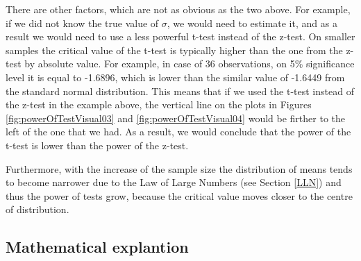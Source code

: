 \documentclass[
]{book}
\theoremstyle{definition}
\theoremstyle{definition}
\theoremstyle{definition}
\theoremstyle{definition}
\theoremstyle{remark}
\begin{document}
There are other factors, which are not as obvious as the two above. For example, if we did not know the true value of \(\sigma\), we would need to estimate it, and as a result we would need to use a less powerful t-test instead of the z-test. On smaller samples the critical value of the t-test is typically higher than the one from the z-test by absolute value. For example, in case of 36 observations, on 5\% significance level it is equal to -1.6896, which is lower than the similar value of -1.6449 from the standard normal distribution. This means that if we used the t-test instead of the z-test in the example above, the vertical line on the plots in Figures \ref{fig:powerOfTestVisual03} and \ref{fig:powerOfTestVisual04} would be firther to the left of the one that we had. As a result, we would conclude that the power of the t-test is lower than the power of the z-test.

Furthermore, with the increase of the sample size the distribution of means tends to become narrower due to the Law of Large Numbers (see Section \ref{LLN}) and thus the power of tests grow, because the critical value moves closer to the centre of distribution.

\subsection{Mathematical explantion}\label{PowerMathematical}
\end{document}
